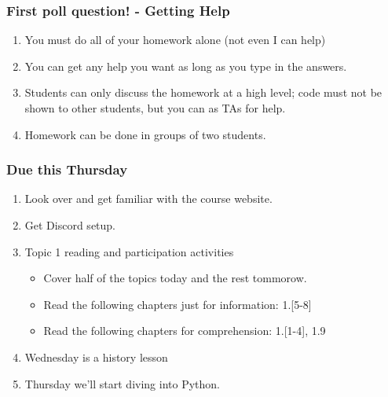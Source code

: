 \documentclass{beamer}
\begin{document}
\begin{frame}
  \frametitle{First poll question! - Getting Help}
  \begin{enumerate}
    \item You must do all of your homework alone (not even I can help)
    \item You can get any help you want as long as you type in the answers.
    \item Students can only discuss the homework at a high level; code must not be shown to other students, but you can as TAs for help.
    \item Homework can be done in groups of two students.
  \end{enumerate}
\end{frame}

\begin{frame}
  \frametitle{Due this Thursday}
  \begin{enumerate}
    \item Look over and get familiar with the course website. 
    \item Get Discord setup.
    \item Topic 1 reading and participation activities
      \begin{itemize}
        \item Cover half of the topics today and the rest tommorow.
        \item Read the following chapters just for information: 1.[5-8]
        \item Read the following chapters for comprehension: 1.[1-4], 1.9
      \end{itemize}
    \item Wednesday is a history lesson
    \item Thursday we'll start diving into Python.
  \end{enumerate}
\end{frame}
\end{document}
